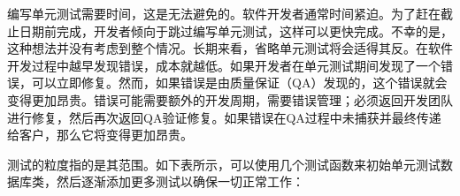 编写单元测试需要时间，这是无法避免的。软件开发者通常时间紧迫。为了赶在截止日期前完成，开发者倾向于跳过编写单元测试，这样可以更快完成。不幸的是，这种想法并没有考虑到整个情况。长期来看，省略单元测试将会适得其反。在软件开发过程中越早发现错误，成本就越低。如果开发者在单元测试期间发现了一个错误，可以立即修复。然而，如果错误是由质量保证（QA）发现的，这个错误就会变得更加昂贵。错误可能需要额外的开发周期，需要错误管理；必须返回开发团队进行修复，然后再次返回QA验证修复。如果错误在QA过程中未捕获并最终传递给客户，那么它将变得更加昂贵。

测试的粒度指的是其范围。如下表所示，可以使用几个测试函数来初始单元测试数据库类，然后逐渐添加更多测试以确保一切正常工作：


